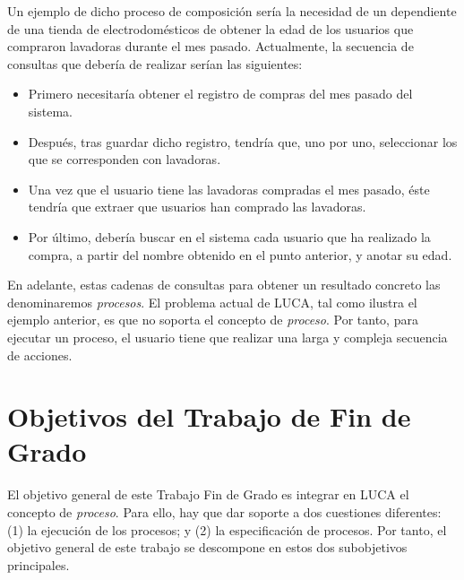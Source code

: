 
Un ejemplo de dicho proceso de composición sería la necesidad de un dependiente de una tienda de electrodomésticos de obtener la edad de los usuarios que compraron lavadoras durante el mes pasado. Actualmente, la secuencia de consultas que debería de realizar serían las siguientes:

\begin{itemize}
	\item Primero necesitaría obtener el registro de compras del mes pasado del sistema.
	\item Después, tras guardar dicho registro, tendría que, uno por uno, seleccionar los que se corresponden con lavadoras.
	\item Una vez que el usuario tiene las lavadoras compradas el mes pasado, éste tendría que extraer que usuarios han comprado las lavadoras.
	\item Por último, debería buscar en el sistema cada usuario que ha realizado la compra, a partir del nombre obtenido en el punto anterior, y anotar su edad.
\end{itemize}

En adelante, estas cadenas de consultas para obtener un resultado concreto las denominaremos \emph{procesos}. El problema actual de LUCA, tal como ilustra el ejemplo anterior, es que no soporta el concepto de \emph{proceso}. Por tanto, para ejecutar un proceso,  el usuario tiene que realizar una larga y compleja secuencia de acciones.

\section{Objetivos del Trabajo de Fin de Grado}

El objetivo general de este Trabajo Fin de Grado es integrar en LUCA el concepto de \emph{proceso}. Para ello, hay que dar soporte a dos cuestiones diferentes: (1) la ejecución de los procesos; y (2) la especificación de procesos. Por tanto, el objetivo general de este trabajo se descompone en estos dos subobjetivos principales. 

